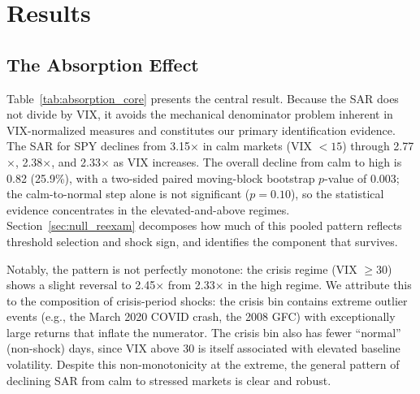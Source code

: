 \documentclass[12pt,a4paper]{article}
\begin{document}
\section{Results}
\label{sec:results}

\subsection{The Absorption Effect}
\label{sec:core}

Table~\ref{tab:absorption_core} presents the central result. Because the SAR does not divide by VIX, it avoids the mechanical denominator problem inherent in VIX-normalized measures and constitutes our primary identification evidence. The SAR for SPY declines from 3.15$\times$ in calm markets (VIX $< 15$) through 2.77$\times$, 2.38$\times$, and 2.33$\times$ as VIX increases. The overall decline from calm to high is 0.82 (25.9\%), with a two-sided paired moving-block bootstrap $p$-value of 0.003; the calm-to-normal step alone is not significant ($p = 0.10$), so the statistical evidence concentrates in the elevated-and-above regimes. Section~\ref{sec:null_reexam} decomposes how much of this pooled pattern reflects threshold selection and shock sign, and identifies the component that survives.

Notably, the pattern is not perfectly monotone: the crisis regime (VIX $\geq 30$) shows a slight reversal to 2.45$\times$ from 2.33$\times$ in the high regime. We attribute this to the composition of crisis-period shocks: the crisis bin contains extreme outlier events (e.g., the March 2020 COVID crash, the 2008 GFC) with exceptionally large returns that inflate the numerator. The crisis bin also has fewer ``normal'' (non-shock) days, since VIX above 30 is itself associated with elevated baseline volatility. Despite this non-monotonicity at the extreme, the general pattern of declining SAR from calm to stressed markets is clear and robust.
\end{document}
